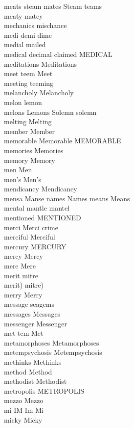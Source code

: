 meats steam mates Steam teams\\
meaty matey\\
mechanics mischance\\
medi demi dime\\
medial mailed\\
medical decimal claimed MEDICAL\\
meditations Meditations\\
meet teem Meet\\
meeting teeming\\
melancholy Melancholy\\
melon lemon\\
melons Lemons Solemn solemn\\
melting Melting\\
member Member\\
memorable Memorable MEMORABLE\\
memories Memories\\
memory Memory\\
men Men\\
men's Men's\\
mendicancy Mendicancy\\
mensa Manse names Names means Means\\
mental mantle mantel\\
mentioned MENTIONED\\
merci Merci crime\\
merciful Merciful\\
mercury MERCURY\\
mercy Mercy\\
mere Mere\\
merit mitre\\
merit) mitre)\\
merry Merry\\
message seagems\\
messages Messages\\
messenger Messenger\\
met tem Met\\
metamorphoses Metamorphoses\\
metempsychosis Metempsychosis\\
methinks Methinks\\
method Method\\
methodist Methodist\\
metropolis METROPOLIS\\
mezzo Mezzo\\
mi IM Im Mi\\
micky Micky\\
